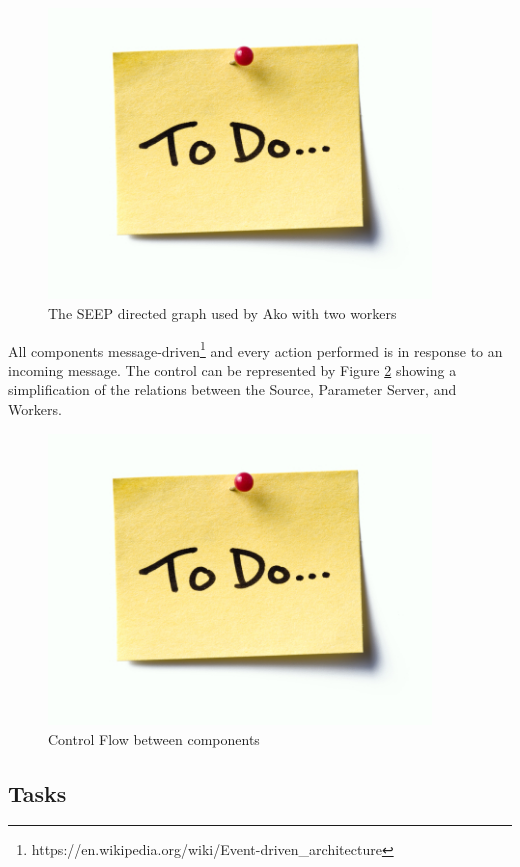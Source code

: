 \documentclass[12pt]{article}
\begin{document}
\begin{figure}[H]
  \centering
  \includegraphics[width=4in]{todo}
  \caption[]{The SEEP directed graph used by Ako with two workers}
  \label{AkoGraph}
\end{figure}

All components message-driven\footnote{https://en.wikipedia.org/wiki/Event-driven\_architecture} and every action performed is in response to an incoming message. The control can be represented by Figure \ref{ControlFlow} showing a simplification of the relations between the Source, Parameter Server, and Workers.

\begin{figure}[H]
  \centering
  \includegraphics[width=4in]{todo}
  \caption[]{Control Flow between components}
  \label{ControlFlow}
\end{figure}

\subsection{Tasks}
\end{document}
